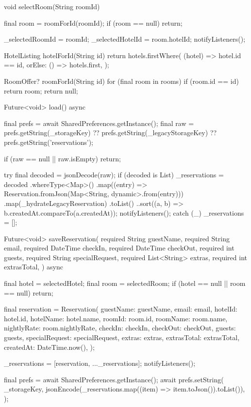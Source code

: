 \documentclass[11pt,a4paper]{article}
\begin{document}
\begin{codeblock}
{  void selectRoom(String roomId) {
    final room = roomForId(roomId);
    if (room == null) {
      return;
    }

    _selectedRoomId = roomId;
    _selectedHotelId = room.hotelId;
    notifyListeners();
  }

  HotelListing hotelForId(String id) {
    return hotels.firstWhere(
      (hotel) => hotel.id == id,
      orElse: () => hotels.first,
    );
  }

  RoomOffer? roomForId(String id) {
    for (final room in rooms) {
      if (room.id == id) {
        return room;
      }
    }
    return null;
  }

  Future<void> load() async {
    final prefs = await SharedPreferences.getInstance();
    final raw = prefs.getString(_storageKey) ??
        prefs.getString(_legacyStorageKey) ??
        prefs.getString('reservations');

    if (raw == null || raw.isEmpty) {
      return;
    }

    try {
      final decoded = jsonDecode(raw);
      if (decoded is List) {
        _reservations = decoded
            .whereType<Map>()
            .map((entry) =>
                Reservation.fromJson(Map<String, dynamic>.from(entry)))
            .map(_hydrateLegacyReservation)
            .toList()
          ..sort((a, b) => b.createdAt.compareTo(a.createdAt));
        notifyListeners();
      }
    } catch (_) {
      _reservations = [];
    }
  }

  Future<void> saveReservation({
    required String guestName,
    required String email,
    required DateTime checkIn,
    required DateTime checkOut,
    required int guests,
    required String specialRequest,
    required List<String> extras,
    required int extrasTotal,
  }) async {
    final hotel = selectedHotel;
    final room = selectedRoom;
    if (hotel == null || room == null) {
      return;
    }

    final reservation = Reservation(
      guestName: guestName,
      email: email,
      hotelId: hotel.id,
      hotelName: hotel.name,
      roomId: room.id,
      roomName: room.name,
      nightlyRate: room.nightlyRate,
      checkIn: checkIn,
      checkOut: checkOut,
      guests: guests,
      specialRequest: specialRequest,
      extras: extras,
      extrasTotal: extrasTotal,
      createdAt: DateTime.now(),
    );

    _reservations = [reservation, ..._reservations];
    notifyListeners();

    final prefs = await SharedPreferences.getInstance();
    await prefs.setString(
      _storageKey,
      jsonEncode(_reservations.map((item) => item.toJson()).toList()),
    );
  }

}
\end{codeblock}
\end{document}
